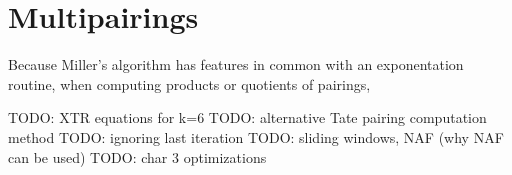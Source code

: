 \section {Multipairings}

Because Miller's algorithm has features in common with an exponentation
routine, when computing products or quotients of pairings,

TODO: XTR equations for k=6
TODO: alternative Tate pairing computation method
TODO: ignoring last iteration
TODO: sliding windows, NAF (why NAF can be used)
TODO: char 3 optimizations
